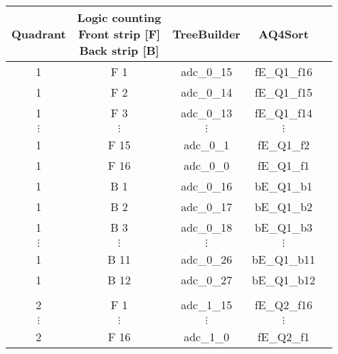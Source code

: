 \begin{tabular}{ccccc}
\hline
Quadrant  & \shortstack{Logic counting \\ Front strip [F] \\ Back strip [B]} & TreeBuilder & AQ4Sort     \\
\hline
1         & F 1                                                              & adc\_0\_15  & fE\_Q1\_f16 \\
1         & F 2                                                              & adc\_0\_14  & fE\_Q1\_f15 \\
1         & F 3                                                              & adc\_0\_13  & fE\_Q1\_f14 \\
$\vdots$  & $\vdots$                                                         & $\vdots$    & $\vdots$    \\
1         & F 15                                                             & adc\_0\_1   & fE\_Q1\_f2  \\
1         & F 16                                                             & adc\_0\_0   & fE\_Q1\_f1  \\
1         & B 1                                                              & adc\_0\_16  & bE\_Q1\_b1  \\
1         & B 2                                                              & adc\_0\_17  & bE\_Q1\_b2  \\
1         & B 3                                                              & adc\_0\_18  & bE\_Q1\_b3  \\
$\vdots$  & $\vdots$                                                         & $\vdots$    & $\vdots$    \\
1         & B 11                                                             & adc\_0\_26  & bE\_Q1\_b11 \\
1         & B 12                                                             & adc\_0\_27  & bE\_Q1\_b12 \\
          &                                                                  &             &             \\
2         & F 1                                                              & adc\_1\_15  & fE\_Q2\_f16 \\
$\vdots$  & $\vdots$                                                         & $\vdots$    & $\vdots$    \\
2         & F 16                                                             & adc\_1\_0   & fE\_Q2\_f1  \\

\end{tabular}
